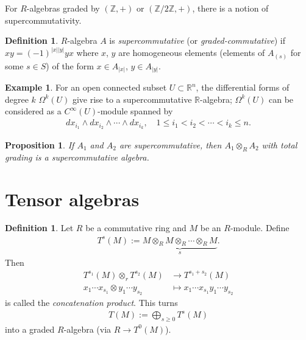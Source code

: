 \documentclass[12pt]{report}
\theoremstyle{plain}
\newtheorem{proposition}[theorem]{Proposition}
\theoremstyle{remark}
\theoremstyle{definition}
\newtheorem{definition}[theorem]{Definition}
\newtheorem{example}[theorem]{Example}
\newcommand{\Z}{\mathbb{Z}}
\newcommand{\R}{\mathbb{R}}
\begin{document}
For $R$-algebras graded by $(\Z,+)$ or $(\Z/2\Z,+)$, there is a notion of supercommutativity.

\begin{definition}
    $R$-algebra $A$ is \emph{supercommutative} (or \emph{graded-commutative}) if $xy=(-1)^{|x||y|}yx$ where $x$, $y$ are homogeneous elements (elements of $A_{(s)}$ for some $s\in S$) of the form $x\in A_{|x|}$, $y\in A_{|y|}$.
\end{definition}

\begin{example}
    For an open connected subset $U\subset \R^n$, the differential forms of degree $k$ $\Omega^k(U)$ give rise to a supercommutative $\R$-algebra; $\Omega^k(U)$ can be considered as a $C^\infty(U)$-module spanned by
    \begin{align*}
        dx_{i_1}\wedge dx_{i_2}\wedge\cdots \wedge dx_{i_k}, \quad 1\le i_1<i_2<\cdots<i_k\le n.
    \end{align*}
\end{example}

\begin{proposition}
    If $A_1$ and $A_2$ are supercommutative, then $A_1\otimes_R A_2$ with total grading is a supercommutative algebra.
\end{proposition}


\section{Tensor algebras}

\begin{definition}
    Let $R$ be a commutative ring and $M$ be an $R$-module. Define
    \begin{align*}
        T^s(M) := \underbrace{M\otimes_R M\otimes_R \cdots\otimes_R M}_s.
    \end{align*}
    Then
    \begin{align*}
        T^{s_1}(M)\otimes_r T^{s_2}(M) &\to T^{s_1+s_2}(M) \\
        x_1\cdots x_{s_1}\otimes y_1\cdots y_{s_2} &\mapsto x_1\cdots x_{s_1}y_1\cdots y_{s_2}
    \end{align*}
    is called the \emph{concatenation product}. This turns
    \begin{align*}
        T(M) := \bigoplus_{s\ge 0} T^s(M)
    \end{align*}
    into a graded $R$-algebra (via $R\to T^0(M)$).
\end{definition}
\end{document}
